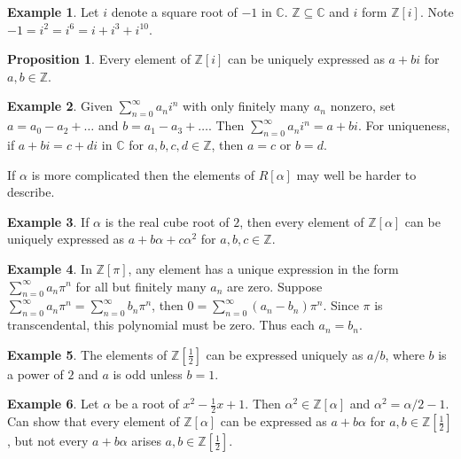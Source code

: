 \documentclass{article}
\newcommand{\Z}{\mathbb{Z}}
\newcommand{\C}{\mathbb{C}}
\newcommand{\rb}[1]{\left( #1 \right)}
\renewcommand{\sb}[1]{\left[ #1 \right]}
\theoremstyle{definition}\newtheorem{definition}{Definition}[section]
\theoremstyle{definition}\newtheorem{remark}[definition]{Remark}
\theoremstyle{definition}\newtheorem*{example}{Example}
\theoremstyle{definition}\newtheorem*{note}{Note}
\newtheorem{proposition}[definition]{Proposition}
\begin{document}
\begin{example}
Let $ i $ denote a square root of $ -1 $ in $ \C $. $ \Z \subseteq \C $ and $ i $ form $ \Z\sb{i} $. Note $ -1 = i^2 = i^6 = i + i^3 + i^{10} $.
\end{example}

\begin{proposition}
Every element of $ \Z\sb{i} $ can be uniquely expressed as $ a + bi $ for $ a, b \in \Z $.
\end{proposition}

\begin{example}
Given $ \sum_{n = 0}^\infty a_ni^n $ with only finitely many $ a_n $ nonzero, set $ a = a_0 - a_2 + \dots $ and $ b = a_1 - a_3 + \dots $. Then $ \sum_{n = 0}^\infty a_ni^n = a + bi $. For uniqueness, if $ a + bi = c + di $ in $ \C $ for $ a, b, c, d \in \Z $, then $ a = c $ or $ b = d $.
\end{example}

If $ \alpha $ is more complicated then the elements of $ R\sb{\alpha} $ may well be harder to describe.

\begin{example}
If $ \alpha $ is the real cube root of $ 2 $, then every element of $ \Z\sb{\alpha} $ can be uniquely expressed as $ a + b\alpha + c\alpha^2 $ for $ a, b, c \in \Z $.
\end{example}

\begin{example}
In $ \Z\sb{\pi} $, any element has a unique expression in the form $ \sum_{n = 0}^\infty a_n\pi^n $ for all but finitely many $ a_n $ are zero. Suppose $ \sum_{n = 0}^\infty a_n\pi^n = \sum_{n = 0}^\infty b_n\pi^n $, then $ 0 = \sum_{n = 0}^\infty \rb{a_n - b_n}\pi^n $. Since $ \pi $ is transcendental, this polynomial must be zero. Thus each $ a_n = b_n $.
\end{example}

\begin{example}
The elements of $ \Z\sb{\tfrac{1}{2}} $ can be expressed uniquely as $ a / b $, where $ b $ is a power of $ 2 $ and $ a $ is odd unless $ b = 1 $.
\end{example}

\begin{example}
Let $ \alpha $ be a root of $ x^2 - \tfrac{1}{2}x + 1 $. Then $ \alpha^2 \in \Z\sb{\alpha} $ and $ \alpha^2 = \alpha / 2 - 1 $. Can show that every element of $ \Z\sb{\alpha} $ can be expressed as $ a + b\alpha $ for $ a, b \in \Z\sb{\tfrac{1}{2}} $, but not every $ a + b\alpha $ arises $ a, b \in \Z\sb{\tfrac{1}{2}} $.
\end{example}
\end{document}
